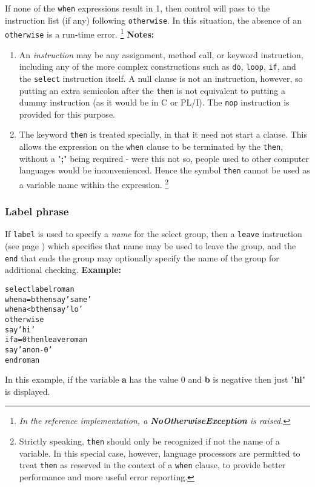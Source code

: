 If none of the \texttt{when} expressions result in 1, then control will
pass to the instruction list (if any) following \texttt{otherwise}.
In this situation, the absence of an \texttt{otherwise} is a run-time
error.
\footnote{
\emph{In the reference implementation, a \textbf{NoOtherwiseException}
is raised.}
}
 \textbf{Notes:}
\begin{enumerate}
\item An \emph{instruction} may be any assignment, method call, or keyword
instruction, including any of the more complex constructions such as
\texttt{do}, \texttt{loop}, \texttt{if}, and the \texttt{select}
instruction itself.
A null clause is not an instruction, however, so putting an extra
semicolon after the \texttt{then} is not equivalent to putting a dummy
instruction (as it would be in C or PL/I).
The \texttt{nop} instruction is provided for this purpose.
\item The keyword \texttt{then} is treated specially, in that it need not
start a clause.
This allows the expression on the \texttt{when} clause to be terminated
by the \texttt{then}, without a "\textbf{;}" being required
- were this not so, people used to other computer languages would
be inconvenienced.
Hence the symbol \texttt{then} cannot be used as a variable name within
the expression.
\footnote{
Strictly speaking, \texttt{then} should only be recognized if not
the name of a variable.  In this special case, however, \nr{} language
processors are permitted to treat \texttt{then} as reserved in the
context of a \texttt{when} clause, to provide better performance and
more useful error reporting.
}
\end{enumerate}
\subsubsection{Label phrase}
 
If \texttt{label} is used to specify a \emph{name} for the select
group, then a  \texttt{leave} instruction (see page \pageref{refleave})  which
specifies that name may be used to leave the group, and the \texttt{end}
that ends the group may optionally specify the name of the group for
additional checking.
 \textbf{Example:}
\begin{alltt}
select label roman
  when a=b then say 'same'
  when a<b then say 'lo'
  otherwise
    say 'hi'
    if a=0 then leave roman
    say 'a non-0'
  end roman
\end{alltt}
In this example, if the variable \textbf{a} has the value 0
and \textbf{b} is negative then just "\textbf{hi}" is
displayed.

